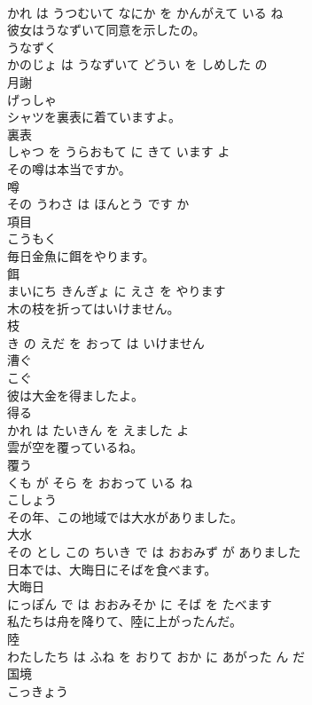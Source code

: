 \documentclass[8pt]{extreport}
\begin{document}
\begin{CJK}{UTF8}{min}
\\	かれ は うつむいて なにか を かんがえて いる ね			
\\	彼女はうなずいて同意を示したの。	
\\	うなずく 
\\	かのじょ は うなずいて どうい を しめした の			
\\	月謝	
\\	げっしゃ			
\\	シャツを裏表に着ていますよ。	
\\	裏表 
\\	しゃつ を うらおもて に きて います よ			
\\	その噂は本当ですか。	
\\	噂 
\\	その うわさ は ほんとう です か			
\\	項目	
\\	こうもく			
\\	毎日金魚に餌をやります。	
\\	餌 
\\	まいにち きんぎょ に えさ を やります			
\\	木の枝を折ってはいけません。	
\\	枝 
\\	き の えだ を おって は いけません			
\\	漕ぐ	
\\	こぐ			
\\	彼は大金を得ましたよ。	
\\	得る 
\\	かれ は たいきん を えました よ			
\\	雲が空を覆っているね。	
\\	覆う 
\\	くも が そら を おおって いる ね			
\\	こしょう	
\\	その年、この地域では大水がありました。	
\\	大水 
\\	その とし この ちいき で は おおみず が ありました			
\\	日本では、大晦日にそばを食べます。	
\\	大晦日 
\\	にっぽん で は おおみそか に そば を たべます			
\\	私たちは舟を降りて、陸に上がったんだ。	
\\	陸 
\\	わたしたち は ふね を おりて おか に あがった ん だ			
\\	国境	
\\	こっきょう			

\end{CJK}
\end{document}
